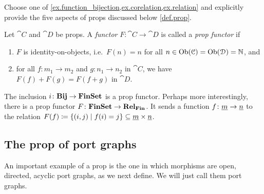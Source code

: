 \documentclass[7Sketches]{subfiles}
\begin{document}
%
%

\begin{exercise}%
\label{exc.prop_practice}
Choose one of \cref{ex.function_bijection,ex.corelation,ex.relation} and explicitly provide the five aspects of props discussed below \cref{def.prop}.
\end{exercise}

\begin{definition}%
\label{def.prop_functor}%
  Let $\cat{C}$ and $\cat{D}$ be props. A \emph{functor} $F\colon\cat{C}\to\cat{D}$ is called a \emph{prop functor} if
  \begin{enumerate}[label=(\alph*)]
  	\item $F$ is identity-on-objects, i.e.\ $F(n)=n$ for all $n\in\operatorname{Ob}(\mathcal{C}) = \operatorname{Ob}(\mathcal{D}) = \mathbb{N}$, and
		\item for all $f\colon m_1\to m_2$ and $g\colon n_1\to n_2$ in $\cat{C}$, we have $F(f)+F(g)=F(f+g)$ in $\cat{D}$.
	\end{enumerate}
\end{definition}

\begin{example}
The inclusion $i\colon\mathbf{Bij}\to\mathbf{FinSet}$ is a prop functor. Perhaps more interestingly, there is a prop functor $F\colon\mathbf{FinSet}\to\mathbf{Rel}_{\mathbf{Fin}}$. It sends a function $f\colon \underline{{m}}\to\underline{{n}}$ to the relation $F(f)\coloneqq\{(i,j)\mid f(i)=j\}\subseteq\underline{{m}}\times\underline{{n}}$.%
\end{example}


\subsection{The prop of port graphs}%
\label{subsec.prop_PGs}%
An important example of a prop is the one in which morphisms are open, directed, acyclic port graphs, as we next define. We will just call them port graphs.
\end{document}
